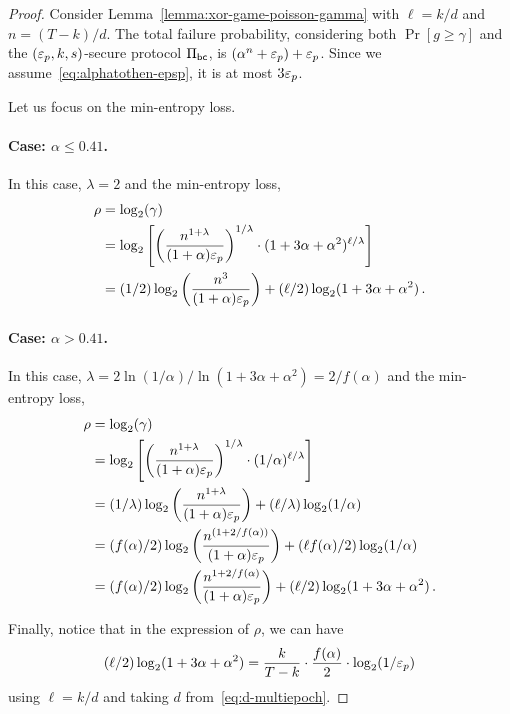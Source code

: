 \begin{proof}  
  Consider Lemma~\ref{lemma:xor-game-poisson-gamma} 
  with $\ell = k/d$ and $n = (T-k)/d$. 
  The total failure probability, 
  considering both $\Pr[g \geq \gamma]$ and 
  the $(\mathsf{\varepsilon}_p, k, s)$-secure protocol $\Pi_\mathsf{bc}$, 
  is $(\alpha^n + \mathsf{\varepsilon}_p) + \mathsf{\varepsilon}_p$. 
  Since we assume~\eqref{eq:alphatothen-epsp}, it is at most $3 \mathsf{\varepsilon}_p$.

  Let us focus on the min-entropy loss.

  \paragraph{Case: $\alpha \leq 0.41$.}
  In this case, $\lambda = 2$ and 
  the min-entropy loss, 
  \begin{align*}
    \rho &= \log_2(\gamma) \\
        &= \log_2 \left[  \left(\frac{n^{1 + \lambda} }{ (1+\alpha) \mathsf{\varepsilon}_p} \right)^{1/\lambda}
          \cdot (1 + 3 \alpha + \alpha^2)^{\ell/\lambda}
        \right] \\
        &= (1/2)\log_2 \left(\frac{n^3}{ (1+\alpha) \mathsf{\varepsilon}_p} \right) 
          + (\ell/2) \log_2(1 + 3 \alpha + \alpha^2)
        \,.
  \end{align*}
  
  \paragraph{Case: $\alpha > 0.41$.}
  In this case, $\lambda = 2 \ln(1/\alpha)/\ln(1+3\alpha+\alpha^2) = 2/f(\alpha)$ and 
  the min-entropy loss, 
  \begin{align*}
    \rho &= \log_2(\gamma) \\
        &= \log_2 \left[  \left(\frac{n^{1 + \lambda} }{ (1+\alpha) \mathsf{\varepsilon}_p} \right)^{1/\lambda}
          \cdot (1/\alpha)^{\ell/\lambda}
        \right] \\
        &= (1/\lambda) \log_2 \left(\frac{n^{1 + \lambda} }{ (1+\alpha) \mathsf{\varepsilon}_p} \right)
          + (\ell/\lambda) \log_2(1/\alpha)
        \\
        &= (f(\alpha)/2)\log_2 \left(\frac{n^{(1 + 2/f(\alpha))} }{ (1+\alpha) \mathsf{\varepsilon}_p} \right) 
          + (\ell f(\alpha)/2) \log_2(1/\alpha)
          \\
        &= (f(\alpha)/2)\log_2 \left(\frac{n^{1 + 2/f(\alpha)} }{ (1+\alpha) \mathsf{\varepsilon}_p} \right) 
          + (\ell/2) \log_2(1 + 3\alpha + \alpha^2)
        \,.
  \end{align*}

  Finally, notice that in the expression of $\rho$, we can have
  $$
  (\ell/2) \log_2(1+3\alpha + \alpha^2) = \frac{k}{T-k} \cdot \frac{f(\alpha)}{2}\cdot \log_2(1/\mathsf{\varepsilon}_p)
  $$
  using $\ell = k/d$ and taking $d$ from~\eqref{eq:d-multiepoch}.
\end{proof}
